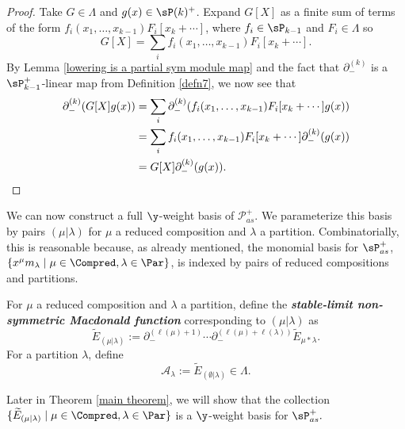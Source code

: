 \begin{proof}
    Take $G \in \Lambda$ and $g(x) \in \sP(k)^{+}$. Expand $G[X]$ as a finite sum of terms of the form $f_i(x_1,\ldots,x_{k-1})F_i[x_k + \cdots]$, where $f_i \in \sP_{k-1}$ and $F_i \in \Lambda$ so 
    $$G[X] = \sum_{i} f_i(x_1,\ldots,x_{k-1})F_i[x_k + \cdots].$$
    By Lemma \ref{lowering is a partial sym module map} and the fact that $\partial_{-}^{(k)}$ is a $\sP_{k-1}^{+}$-linear map from Definition \ref{defn7}, we now see that 
\begin{align*}
    \partial_{-}^{(k)}(G[X]g(x)) &= 
    \sum_{i} \partial_{-}^{(k)}( f_i(x_1,\ldots,x_{k-1})F_i[x_k + \cdots]g(x)) \\
    &= \sum_{i} f_i(x_1,\ldots,x_{k-1})F_i[x_k + \cdots]\partial_{-}^{(k)}(g(x)) \\
    &= G[X]\partial_{-}^{(k)}(g(x)). \qedhere
\end{align*}
\end{proof}

We can now construct a full $\y$-weight basis of $\mathscr{P}_{as}^{+}$. We parameterize this basis by pairs $(\mu | \lambda)$ for $\mu$ a reduced composition and $\lambda$ a partition. Combinatorially, this is reasonable because, as already mentioned, the monomial basis for $\sP_{as}^{+}$, $\{x^{\mu}m_{\lambda} \mid \mu \in \Compred, \lambda \in \Par\}$, is indexed by pairs of reduced compositions and partitions.

\begin{defi} \label{defn9}
For $\mu$ a reduced composition and $\lambda$ a partition, define the \textbf{\textit{stable-limit non-symmetric Macdonald function}} corresponding to $(\mu|\lambda)$ as
\begin{equation}
    \widetilde{E}_{(\mu|\lambda)} :=  \partial_{-}^{(\ell(\mu)+1)}\cdots \partial_{-}^{(\ell(\mu)+\ell(
\lambda))} \widetilde{E}_{\mu*\lambda}.
\end{equation}
For a partition $\lambda$, define
\begin{equation}\label{A-Lambda basis}
\mathcal{A}_{\lambda} := \widetilde{E}_{(\emptyset|\lambda)} \in \Lambda .
\end{equation}

\end{defi}

Later in Theorem \ref{main theorem}, we will show that the collection $\{\widetilde{E}_{(\mu|\lambda)} \mid \mu \in \Compred, \lambda \in \Par\}$ is a $\y$-weight basis for $\sP_{as}^{+}.$


